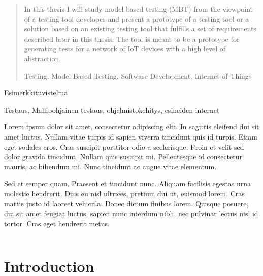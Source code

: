 \documentclass[a4paper, 12pt,titlepage]{dithesis}
\begin{document}

\begin{abstract}
In this thesis I will study model based testing (MBT) from the viewpoint of a testing tool developer
and present a prototype of a testing tool or a solution based on an existing testing tool that fulfills 
a set of requirements described later in this thesis. The tool is meant to be a prototype for generating tests 
for a network of IoT devices with a high level of abstraction.    

\keywords Testing, Model Based Testing, Software Development, Internet of Things

\end{abstract}

\begin{tiivistelma}
Esimerkkitiivistelmä

\avainsanat Testaus, Mallipohjainen testaus, ohjelmistokehitys, esineiden internet
\end{tiivistelma}


\sisluettelo

Lorem ipsum dolor sit amet, consectetur adipiscing elit. In sagittis eleifend dui sit amet luctus. Nullam vitae turpis id sapien viverra tincidunt quis id turpis. Etiam eget sodales eros. Cras suscipit porttitor odio a scelerisque. Proin et velit sed dolor gravida tincidunt. Nullam quis suscipit mi. Pellentesque id consectetur mauris, ac bibendum mi. Nunc tincidunt ac augue vitae elementum.

Sed et semper quam. Praesent et tincidunt nunc. Aliquam facilisis egestas urna molestie hendrerit. Duis eu nisl ultrices, pretium dui ut, euismod lorem. Cras mattis justo id laoreet vehicula. Donec dictum finibus lorem. Quisque posuere, dui sit amet feugiat luctus, sapien nunc interdum nibh, nec pulvinar lectus nisl id tortor. Cras eget hendrerit metus.


\setlongtables
\begin{longtable}[l]{p{3cm}p{}}



\end{longtable}
\setcounter{table}{0}

\chapter{Introduction}
\sivunumerot
\thispagestyle{empty}
\end{document}
